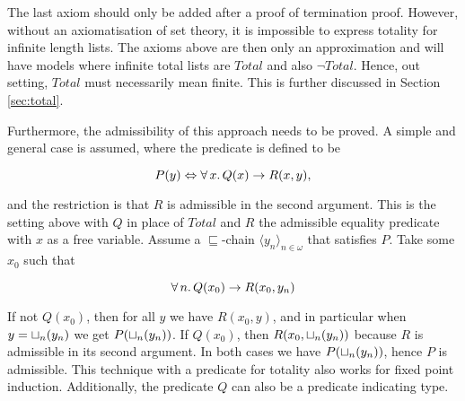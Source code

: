 The last axiom should only be added after a proof of termination
proof. However, without an axiomatisation of set theory, it is
impossible to express totality for infinite length lists. The axioms
above are then only an approximation and will have models where
infinite total lists are $Total$ and also $\neg Total$. Hence, out
setting, $Total$ must necessarily mean finite. This is further
discussed in Section \ref{sec:total}.

\pagebreak
Furthermore, the admissibility of this approach needs to be proved. A
simple and general case is assumed, where the predicate is defined to
be

$$P(y) \Leftrightarrow \forall \, x . \, Q(x) \rightarrow R(x,y),$$

\noindent
and the restriction is that $R$ is admissible in the second
argument. This is the setting above with $Q$ in place of $Total$ and
$R$ the admissible equality predicate with $x$ as a free
variable. Assume a $\sqsubseteq$-chain $\langle y_n
\rangle_{n\in\omega}$ that satisfies $P$. Take some $x_0$ such that

$$\forall \, n . \, Q(x_0) \rightarrow R(x_0,y_n)$$

If not $Q(x_0)$, then for all $y$ we have $R(x_0,y)$, and in
particular when $y=\sqcup_{n}(y_n)$ we get $P(\sqcup_{n}(y_n))$. If
$Q(x_0)$, then $R(x_0,\sqcup_{n}(y_n))$ because $R$ is admissible in its
second argument. In both cases we have $P(\sqcup_{n}(y_n))$, hence $P$
is admissible. This technique with a predicate for totality also works
for fixed point induction. Additionally, the predicate $Q$ can also be a
predicate indicating type.
